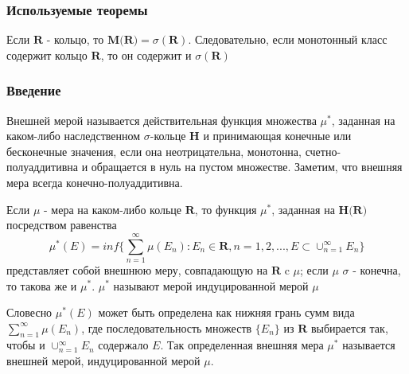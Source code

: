 \subsubsection{Используемые теоремы}

\begin{theorem_sub}
\cite{HalmoshTheoryM1953}
\label{monoton}
Если $\textbf{R}$ - кольцо, то $\textbf{M(R)} = \sigma(\textbf{R})$. Следовательно, если монотонный класс содержит кольцо $\textbf{R}$, то он содержит и $\sigma(\textbf{R})$
\end{theorem_sub}

\subsubsection{Введение}

\begin{definition} Внешней мерой называется действительная функция множества $\mu^{*}$, заданная на каком-либо наследственном $\sigma$-кольце $\textbf{H}$ и принимающая конечные или бесконечные значения, если она неотрицательна, монотонна, счетно-полуаддитивна и обращается в нуль на пустом множестве. Заметим, что внешняя мера всегда конечно-полуаддитивна. %
	\end{definition}

\begin{theorem_sub}
\cite{HalmoshTheoryM1953}
\label{to_mu_star}
Если $\mu$ - мера на каком-либо кольце $\textbf{R}$, то функция $\mu^{*}$, заданная на $\textbf{H(R)}$ посредством равенства
$$
	\mu^{*}(E) = inf\{ \sum_{n = 1}^{\infty}\mu(E_n): E_n \in \textbf{R}, n = 1, 2, ..., E \subset  \cup_{n = 1}^{\infty}E_n\}
$$
представляет собой внешнюю меру, совпадающую на $\textbf{R}$ c $\mu$; если $\mu$ $\sigma$ - конечна, то такова же и $\mu^{*}$. $\mu^{*}$ называют мерой индуцированной мерой $\mu$ 
\end{theorem_sub}

Словесно $\mu^{*}(E)$ может быть определена как нижняя грань сумм вида $\sum_{n = 1}^{\infty}\mu(E_n)$, где последовательность множеств $\{E_n\}$ из $\textbf{R}$ выбирается так, чтобы и $\cup_{n = 1}^{\infty}E_n$ содержало $E$. Так определенная внешняя мера $\mu^{*}$ называется внешней мерой, индуцированной мерой $\mu$. 

